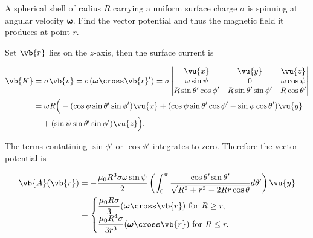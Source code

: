 \documentclass[english,a4paper,12pt]{report}
\begin{document}
{A spherical shell of radius \(R\) carrying a uniform surface charge \(\sigma \) is spinning at angular velocity \(\boldsymbol{\omega } \). Find the vector potential and thus the magnetic field it produces at point \(r\).}
{Set \(\vb{r} \) lies on the \(z\)-axis, then the surface current is

\begin{equation}
    \begin{aligned} 
        \vb{K} &= \sigma \vb{v} 
        = \sigma (\boldsymbol{\omega} \cross \vb{r}') 
        = \sigma 
        \begin{vmatrix}
            \vu{x}  & \vu{y}  & \vu{z}   \\
            \omega \sin \psi  & 0 & \omega \cos \psi   \\
            R \sin \theta' \cos \phi' & R\sin \theta' \sin \phi' & R\cos \theta'  \\
        \end{vmatrix} \\ 
        &= \omega R \Big( 
        - (\cos \psi \sin \theta' \sin \phi') \vu{x} 
        + (\cos \psi \sin \theta' \cos \phi' - \sin \psi \cos \theta') \vu{y} \\ 
        &\quad + (\sin \psi \sin \theta' \sin \phi') \vu{z}  
        \Big).
    \end{aligned} 
\end{equation}



The terms contatining \(\sin \phi ' \text { or } \cos \phi '\) integrates to zero. Therefore the vector potential is 

\begin{equation}
    \begin{aligned} 
    \vb{A} (\vb{r} ) &= - \frac{\mu_0 R^3 \sigma \omega \sin \psi }{2}\left( \int_{0}^{\pi } \frac{\cos \theta '\sin \theta '}{\sqrt{R^2+r^2-2Rr\cos \theta } } d \theta '    \right) \vu{y}    \\
    &= \begin{cases}
        \displaystyle \frac{\mu_0 R \sigma }{3}(\boldsymbol{\omega }\cross \vb{r}  )  \text{ for } R \ge r,\\
        \displaystyle \frac{\mu_0 R^4 \sigma }{3r^3 }(\boldsymbol{\omega }\cross \vb{r}  )  \text{ for } R \le r.
    \end{cases}
    \end{aligned}  
\end{equation}

}
\end{document}
